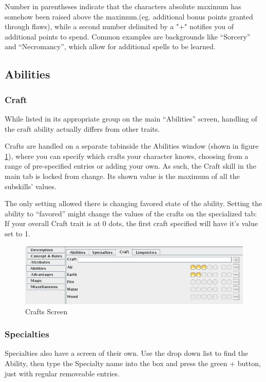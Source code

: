 Number in parentheses indicate that the characters absolute maximum has somehow been raised above the maximum.(eg. additional bonus points granted through flaws), while a second number delimited by a "+" notifies you of additional points to spend. Common examples are backgrounds like "`Sorcery"' and "`Necromancy"', which allow for additional spells to be learned.

\subsection{Abilities}
\subsubsection{Craft}
While listed in its appropriate group on the main "`Abilities"' screen, handling of the craft ability actually differs from other traits.

Crafts are handled on a separate tabinside the Abilities window (shown in figure \ref{fig:crafts}), where you can specify which crafts your character knows, choosing from a range of pre-specified entries or adding your own. As such, the Craft skill in the main tab is locked from change. Its shown value is the maximum of all the subskills' values.

The only setting allowed there is changing favored state of the ability. Setting the ability to "`favored"' might change the values of the crafts on the specialized tab: If your overall Craft trait is at 0 dots, the first craft specified will have it's value set to 1.


\begin{figure}
	\centering
		\includegraphics[width=1.00\textwidth]{images/crafts.jpg}
	\caption{Crafts Screen}
	\label{fig:crafts}
\end{figure}

\subsubsection{Specialties}
Specialties also have a screen of their own. Use the drop down list to find the Ability, then type the Specialty name into the box and press the green + button, just with regular removeable entries.

